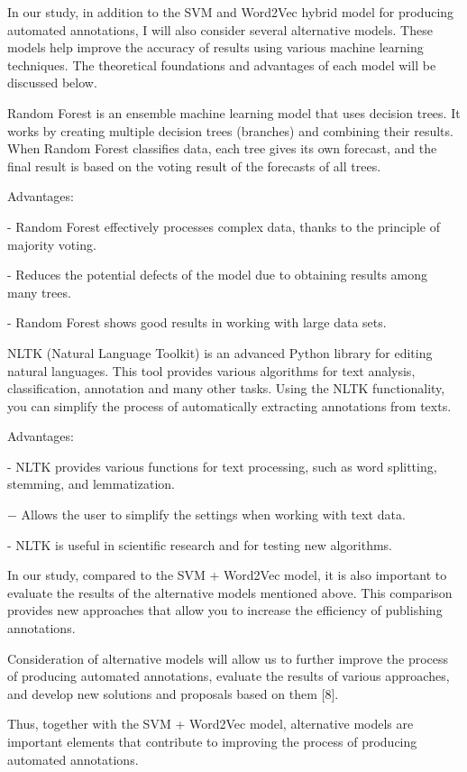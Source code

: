 \documentclass[
]{article}
\begin{document}
In our study, in addition to the SVM and Word2Vec hybrid model for
producing automated annotations, I will also consider several
alternative models. These models help improve the accuracy of results
using various machine learning techniques. The theoretical foundations
and advantages of each model will be discussed below.

Random Forest is an ensemble machine learning model that uses decision
trees. It works by creating multiple decision trees (branches) and
combining their results. When Random Forest classifies data, each tree
gives its own forecast, and the final result is based on the voting
result of the forecasts of all trees.

Advantages:

- Random Forest effectively processes complex data, thanks to the
principle of majority voting.

- Reduces the potential defects of the model due to obtaining results
among many trees.

- Random Forest shows good results in working with large data sets.

NLTK (Natural Language Toolkit) is an advanced Python library for
editing natural languages. This tool provides various algorithms for
text analysis, classification, annotation and many other tasks. Using
the NLTK functionality, you can simplify the process of automatically
extracting annotations from texts.

Advantages:

- NLTK provides various functions for text processing, such as word
splitting, stemming, and lemmatization.

− Allows the user to simplify the settings when working with text data.

- NLTK is useful in scientific research and for testing new algorithms.

In our study, compared to the SVM + Word2Vec model, it is also important
to evaluate the results of the alternative models mentioned above. This
comparison provides new approaches that allow you to increase the
efficiency of publishing annotations.

Consideration of alternative models will allow us to further improve the
process of producing automated annotations, evaluate the results of
various approaches, and develop new solutions and proposals based on
them {[}8{]}.

Thus, together with the SVM + Word2Vec model, alternative models are
important elements that contribute to improving the process of producing
automated annotations.
\end{document}
